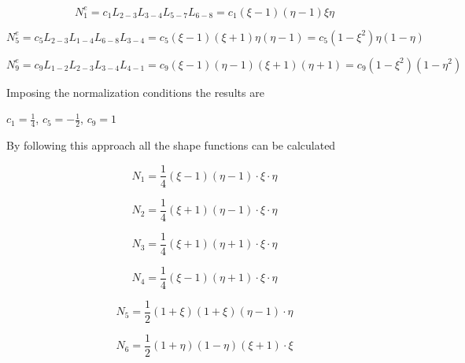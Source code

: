 \documentclass{article}
\begin{document}
\begin{equation} \label{eq: Quad8_1}
N_1^e = c_1 L_{2-3}L_{3-4}L_{5-7} L_{6-8} = c_1 \left(\xi - 1\right) \left(\eta -1\right) \xi \eta
\end{equation}

\begin{equation} \label{eq: Quad8_2}
N_5^e = c_5L_{2-3} L_{1-4} L_{6-8} L_{3-4} = c_5 \left(\xi -1 \right) \left( \xi +1\right) \eta \left( \eta -1\right) = c_5 \left(1-\xi^2\right) \eta \left(1 - \eta\right)
\end{equation}

\begin{equation} \label{eq: Quad8_3}
N_9^e = c_9L_{1-2} L_{2-3} L_{3-4} L_{4-1} = c_9 \left(\xi -1 \right) \left( \eta - 1\right) \left(\xi + 1\right) \left( \eta + 1\right) = c_9 \left(1-\xi^2\right) \left(1 - \eta^2\right)
\end{equation}

Imposing the normalization conditions the results are 

\begin{center}
$c_1 = \frac{1}{4}$, \quad $c_5 = -\frac{1}{2}$, $c_9 = 1$
\end{center}

By following this approach all the shape functions can be calculated

\begin{equation}
N_1 = \frac{1}{4} \left(\xi - 1\right) \left( \eta -1 \right) \cdot\xi \cdot\eta
\end{equation}

\begin{equation}
N_2 = \frac{1}{4} \left(\xi + 1\right) \left( \eta -1 \right) \cdot\xi \cdot\eta
\end{equation}

\begin{equation}
N_3 = \frac{1}{4} \left(\xi + 1\right) \left( \eta + 1 \right) \cdot\xi \cdot\eta
\end{equation}

\begin{equation}
N_4 = \frac{1}{4} \left(\xi - 1\right) \left( \eta + 1 \right) \cdot\xi \cdot\eta
\end{equation}

\begin{equation}
N_5 = \frac{1}{2} \left(1 + \xi \right) \left( 1 + \xi \right)  \left( \eta - 1\right) \cdot\eta
\end{equation}

\begin{equation}
N_6 = \frac{1}{2} \left(1 + \eta \right) \left( 1 - \eta \right)  \left( \xi + 1\right) \cdot\xi
\end{equation}
\end{document}
